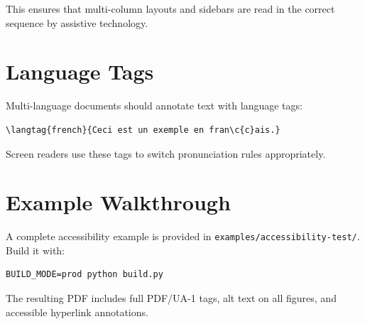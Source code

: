 This ensures that multi-column layouts and sidebars are read in the correct
sequence by assistive technology.

\section{Language Tags}

Multi-language documents should annotate text with language tags:

\begin{verbatim}
\langtag{french}{Ceci est un exemple en fran\c{c}ais.}
\end{verbatim}

Screen readers use these tags to switch pronunciation rules appropriately.

\section{Example Walkthrough}

A complete accessibility example is provided in
\texttt{examples/accessibility-test/}.  Build it with:

\begin{verbatim}
BUILD_MODE=prod python build.py
\end{verbatim}

The resulting PDF includes full PDF/UA-1 tags, alt text on all figures, and
accessible hyperlink annotations.
